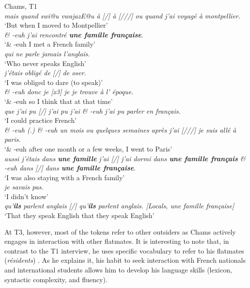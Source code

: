 \documentclass[output=paper]{langscibook}
\begin{document}
\ea%
\label{ex:8}Chams, T1\medskip\\
\textit{mais quand swi@u vwajazE@u à [/] à [///] ou quand j'ai voyagé à montpellier.}\\
\glt `But when I moved to Montpellier'\\
\textit{\& -euh j'ai rencontré \textbf{une famille française}}.\\
\glt `\& -euh I met a French family'\\
\textit{qui ne parle jamais l'anglais}.\\
\glt `Who never speaks English'\\
\textit{j'étais obligé de [/] de oser.}\\
\glt `I was obliged to dare (to speak)'\\
\textit{\& -euh donc je [x3] je je trouve à l' époque.}\\
\glt `\& -euh so I think that at that time'\\
\textit{que j'ai pu [/] j'ai pu j'ai \& -euh j'ai pu parler en français.}\\
\glt `I could practice French'\\
\textit{\& -euh (.) \& -euh un mois ou quelques semaines après j'ai [///] je suis allé à paris.}\\
\glt `\& -euh after one month or a few weeks, I went to Paris'\\
\textit{aussi j'étais dans \textbf{une famille} j'ai [/] j'ai dormi dans \textbf{une famille français} \& -euh dans [/] dans \textbf{une famille française}}.\\
\glt `I was also staying with a French family'\\
\textit{je savais pas.}\\
\glt `I didn’t know'\\
\textit{qu'\textbf{ils} parlent anglais [/] qu'\textbf{ils} parlent anglais. [Locals, une famille française]}\\
\glt `That they speak English that they speak English'
\z

At T3, however, most of the tokens refer to other outsiders as Chams actively engages in interaction with other flatmates. It is interesting to note that, in contrast to the T1 interview, he uses specific vocabulary to refer to his flatmates (\textit{résidents}) . As he explains it, his habit to seek interaction with French nationals and international students allows him to develop his language skills (lexicon, syntactic complexity, and fluency).
\end{document}
